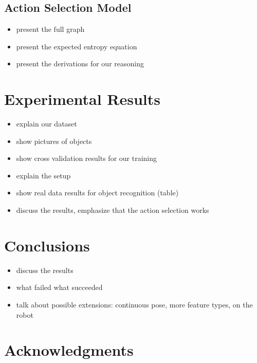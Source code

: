 \documentclass[conference]{IEEEtran}
\begin{document}
\subsection{Action Selection Model}
\begin{itemize}
\item present the full graph
\item present the expected entropy equation
\item present the derivations for our reasoning
\end{itemize}

\section{Experimental Results}
\begin{itemize}
\item explain our dataset
\item show pictures of objects
\item show cross validation results for our training
\item explain the setup
\item show real data results for object recognition (table)
\item discuss the results, emphasize that the action selection works
\end{itemize}

\section{Conclusions}
\begin{itemize}
\item discuss the results
\item what failed what succeeded
\item talk about possible extensions: continuous pose, more feature types, on the robot
\end{itemize}

\section*{Acknowledgments}

\cite{McGeer01041990}







\end{document}
